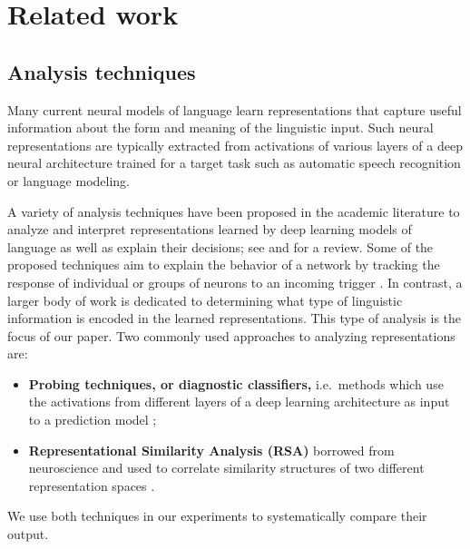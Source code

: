 \section{Related work}
\label{sec:related}

\subsection{Analysis techniques}


Many current neural models of language learn representations that capture useful 
information about the form and meaning of the linguistic input.
Such neural representations are typically extracted from activations of various layers 
of a deep neural architecture trained for a target task such as automatic speech recognition 
or language modeling. 

A variety of analysis techniques have been proposed in the academic
literature to analyze and interpret representations learned by deep
learning models of language as well as explain their decisions; see
\citet{belinkov2019analysis} and \citet{alishahi2019analyzing} for a
review.
%
Some of the proposed techniques aim to  explain the behavior of a
network by tracking the response of individual or groups of neurons to
an incoming trigger \cite[e.g.,][]{nagamine2015exploring,krug2018neuron}.
%
In contrast, a larger body of work is dedicated to determining what type of linguistic
information is encoded in the learned representations. This type of analysis is the 
focus of our paper.
Two commonly used approaches to analyzing representations are:
\begin{itemize}
\item {\bf Probing techniques, or diagnostic classifiers,} i.e.\ methods which use the activations
from different layers of a deep learning architecture as input to a
prediction model \cite[e.g.,][]{adi2016fine,alishahi-etal-2017-encoding,hupkes2018visualisation,conneau-etal-2018-cram};
\item {\bf Representational Similarity Analysis (RSA)} borrowed from neuroscience
\cite{kriegeskorte2008representational} and used to correlate similarity
structures of two different representation spaces 
\cite{bouchacourt-baroni-2018-agents,chrupala-alishahi-2019-correlating,abnar-etal-2019-blackbox,abdou-etal-2019-higher}.
\end{itemize}
We use both techniques in our experiments to systematically compare their output.


